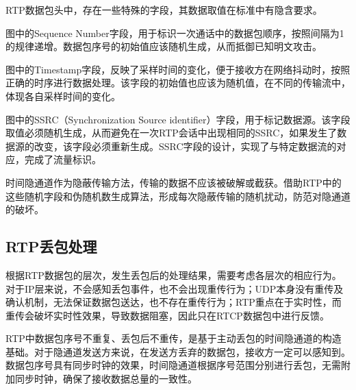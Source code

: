RTP数据包头中，存在一些特殊的字段，其数据取值在标准中有隐含要求。

图中的Sequence Number字段，用于标识一次通话中的数据包顺序，按照间隔为1的规律递增。数据包序号的初始值应该随机生成，从而抵御已知明文攻击。

图中的Timestamp字段，反映了采样时间的变化，便于接收方在网络抖动时，按照正确的时序进行数据处理。该字段的初始值也应该为随机值，在不同的传输流中，体现各自采样时间的变化。

图中的SSRC（Synchronization Source identifier）字段，用于标记数据源。该字段取值必须随机生成，从而避免在一次RTP会话中出现相同的SSRC，如果发生了数据源的改变，该字段必须重新生成。SSRC字段的设计，实现了与特定数据流的对应，完成了流量标识。

时间隐通道作为隐蔽传输方法，传输的数据不应该被破解或截获。借助RTP中的这些随机字段和伪随机数生成算法，形成每次隐蔽传输的随机扰动，防范对隐通道的破坏。

\subsection{RTP丢包处理}
\label{chap:backinfo:dropout}

根据RTP数据包的层次，发生丢包后的处理结果，需要考虑各层次的相应行为。对于IP层来说，不会感知丢包事件，也不会出现重传行为；UDP本身没有重传及确认机制，无法保证数据包送达，也不存在重传行为；RTP重点在于实时性，而重传会破坏实时性效果，导致数据阻塞，因此只在RTCP数据包中进行反馈。

RTP中数据包序号不重复、丢包后不重传，是基于主动丢包的时间隐通道的构造基础。对于隐通道发送方来说，在发送方丢弃的数据包，接收方一定可以感知到。数据包序号具有同步时钟的效果，时间隐通道根据序号范围分别进行丢包，无需附加同步时钟，确保了接收数据总量的一致性。